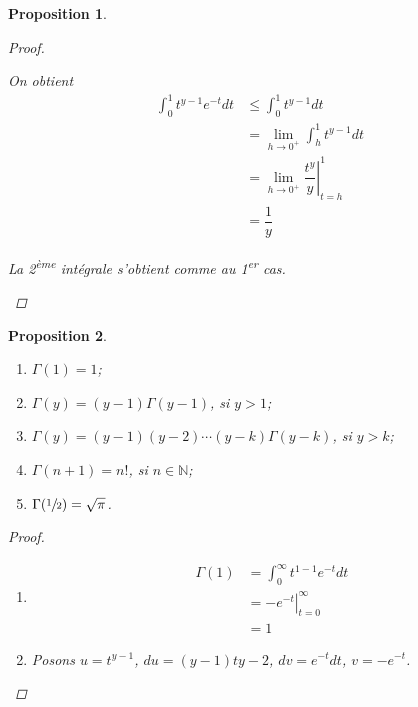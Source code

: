 \documentclass{report}
\newcommand*{\dlim}[3]{\displaystyle\lim_{#1 \to #2}#3}
\newcommand*{\dint}[3]{\displaystyle\int_{#1}^{#2}#3}
\newcommand*{\lte}{\leqslant}
\newcommand*{\naturels}{\mathbb{N}}
\newtheorem*{prop}{Proposition}
\theoremstyle{definition}
\theoremstyle{remark}
\begin{document}
\begin{prop}
\begin{proof}
\begin{enumerate}
				On obtient
				\begin{align*}
					\dint{0}{1}{t^{y-1}e^{-t} dt}&\lte \dint{0}{1}{t^{y-1} dt}\\
					&= \dlim{h}{0^+}{\dint{h}{1}{t^{y-1} dt}}\\
					&= \dlim{h}{0^+}{\left. \dfrac{t^y}{y} \right|_{t=h}^1}\\
					&= \dfrac{1}{y}
				\end{align*}

				La 2\textsuperscript{\`eme} int\'egrale s'obtient comme au 1\textsuperscript{er} cas.
			\end{enumerate}
		\end{proof}
	\end{prop}
	\begin{prop}~

		\begin{enumerate}[label=\alph*)]
			\item $\Gamma(1)=1$;
			\item $\Gamma(y)=(y-1) \Gamma(y-1)$, si $y>1$;
			\item $\Gamma(y)=(y-1)(y-2)\dotsb(y-k) \Gamma(y-k)$, si $y>k$;
			\item $\Gamma(n+1)=n!$, si $n \in \naturels$;
			\item $\Gamma(\sfrac{1}{2})=\sqrt{\pi}$.
		\end{enumerate}
		\begin{proof}~

			\begin{enumerate}[label=\alph*)]
				\item \begin{align*}
					\Gamma(1)&= \dint{0}{\infty}{t^{1-1}e^{-t} dt}\\
					&= \left. -e^{-t} \right|_{t=0}^\infty\\
					&= 1
				\end{align*}
				\item Posons $u=t^{y-1}$, $du=(y-1)t{y-2}$, $dv=e^{-t}dt$, $v=-e^{-t}$.


\end{enumerate}
\end{proof}
\end{prop}
\end{document}
